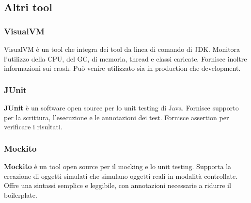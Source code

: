 \documentclass[11pt]{article}
\begin{document}
\subsection{Altri tool}
\subsubsection{VisualVM}
VisualVM è un tool che integra dei tool da linea di comando di JDK. Monitora l'utilizzo della CPU, del GC, di memoria, thread e classi caricate. Fornisce inoltre informazioni sui crash. Può venire utilizzato sia in production che development.
\subsubsection{JUnit}
\textbf{JUnit} è un software open source per lo unit testing di Java. Fornisce supporto per la scrittura, l'esecuzione e le annotazioni dei test. Fornisce assertion per verificare i risultati. 
\subsubsection{Mockito}
\textbf{Mockito} è un tool open source per il mocking e lo unit testing. Supporta la creazione di oggetti simulati che simulano oggetti reali in modalità controllate. Offre una sintassi semplice e leggibile, con annotazioni necessarie a ridurre il boilerplate. 
\end{document}
